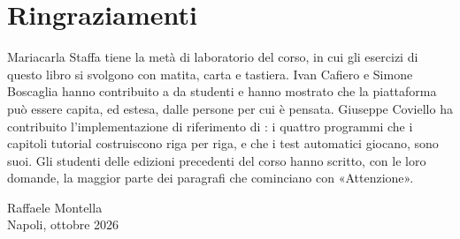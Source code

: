 \section*{Ringraziamenti}

Mariacarla Staffa tiene la metà di laboratorio del corso, in cui gli esercizi
di questo libro si svolgono con matita, carta e tastiera. Ivan Cafiero e Simone
Boscaglia hanno contribuito a \prg da studenti e hanno mostrato che la
piattaforma può essere capita, ed estesa, dalle persone per cui è pensata.
Giuseppe Coviello ha contribuito l'implementazione di riferimento di \vermone:
i quattro programmi che i capitoli tutorial costruiscono riga per riga, e che i
test automatici giocano, sono suoi.
Gli studenti delle edizioni precedenti del corso hanno scritto, con le loro
domande, la maggior parte dei paragrafi che cominciano con «Attenzione».

\begin{flushright}
Raffaele Montella\\
Napoli, ottobre 2026
\end{flushright}
